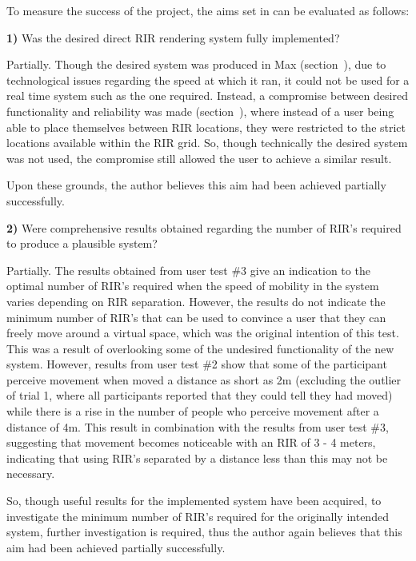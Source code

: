 \documentclass[../../main.tex]{subfiles}
\begin{document}
			To measure the success of the project, the aims set in  can be evaluated as follows:

			\textbf{1)} Was the desired direct \ac{RIR} rendering system fully implemented?

				Partially. Though the desired system was produced in Max (section~), due to technological issues regarding the speed at which it ran, it could not be used for a real time system such as the one required. Instead, a compromise between desired functionality and reliability was made (section~), where instead of a user being able to place themselves between \ac{RIR} locations, they were restricted to the strict locations available within the \ac{RIR} grid. So, though technically the desired system was not used, the compromise still allowed the user to achieve a similar result.

				Upon these grounds, the author believes this aim had been achieved partially successfully.


			\textbf{2)} Were comprehensive results obtained regarding the number of \ac{RIR}'s required to produce a plausible system?


				Partially. The results obtained from user test \#3 give an indication to the optimal number of \ac{RIR}'s required when the speed of mobility in the system varies depending on \ac{RIR} separation. However, the results do not indicate the minimum number of \ac{RIR}'s that can be used to convince a user that they can freely move around a virtual space, which was the original intention of this test. This was a result of overlooking some of the undesired functionality of the new system. However, results from user test \#2 show that some of the participant perceive movement when moved a distance as short as 2m (excluding the outlier of trial 1, where all participants reported that they could tell they had moved) while there is a rise in the number of people who perceive movement after a distance of 4m. This result in combination with the results from user test \#3, suggesting that movement becomes noticeable with an \ac{RIR} of 3 - 4 meters, indicating that using \ac{RIR}'s separated by a distance less than this may not be necessary.

				So, though useful results for the implemented system have been acquired, to investigate the minimum number of \ac{RIR}'s required for the originally intended system, further investigation is required, thus the author again believes that this aim had been achieved partially successfully.
\end{document}

